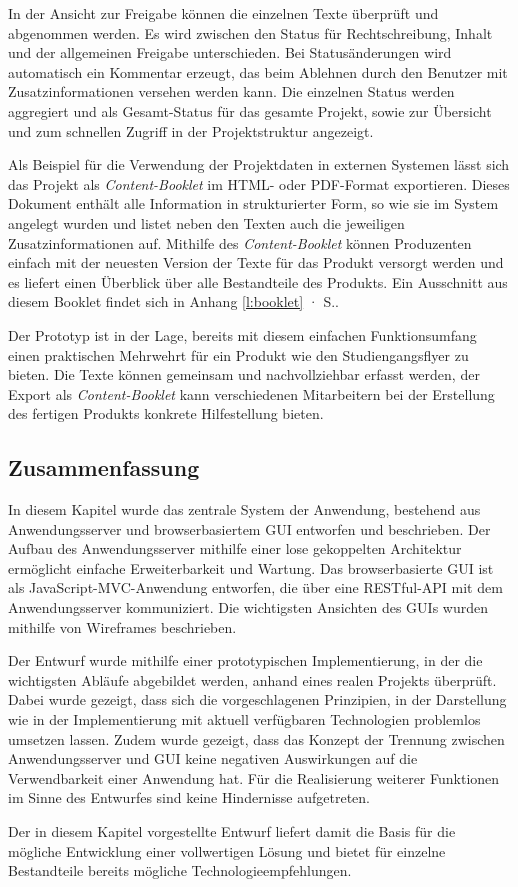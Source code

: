 In der Ansicht zur Freigabe können die einzelnen Texte überprüft und abgenommen werden. Es wird zwischen den Status für Rechtschreibung, Inhalt und der allgemeinen Freigabe unterschieden. Bei Statusänderungen wird automatisch ein Kommentar erzeugt, das beim Ablehnen durch den Benutzer mit Zusatzinformationen versehen werden kann. Die einzelnen Status werden aggregiert und als Gesamt-Status für das gesamte Projekt, sowie zur Übersicht und zum schnellen Zugriff in der Projektstruktur angezeigt.

Als Beispiel für die Verwendung der Projektdaten in externen Systemen lässt sich das Projekt als \emph{Content-Booklet} im HTML- oder PDF-Format exportieren. Dieses Dokument enthält alle Information in strukturierter Form, so wie sie im System angelegt wurden und listet neben den Texten auch die jeweiligen Zusatzinformationen auf. Mithilfe des \emph{Content-Booklet} können Produzenten einfach mit der neuesten Version der Texte für das Produkt versorgt werden und es liefert einen Überblick über alle Bestandteile des Produkts. Ein Ausschnitt aus diesem Booklet findet sich in Anhang \ref{l:booklet} · S.\pageref{l:booklet}.

\secbar

Der Prototyp ist in der Lage, bereits mit diesem einfachen Funktionsumfang einen praktischen Mehrwehrt für ein Produkt wie den Studiengangsflyer zu bieten. Die Texte können gemeinsam und nachvollziehbar erfasst werden, der Export als \emph{Content-Booklet} kann verschiedenen Mitarbeitern bei der Erstellung des fertigen Produkts konkrete Hilfestellung bieten.

\pagebreak

\subsection{Zusammenfassung}

In diesem Kapitel wurde das zentrale System der Anwendung, bestehend aus Anwendungsserver und browserbasiertem GUI entworfen und beschrieben. Der Aufbau des Anwendungsserver mithilfe einer lose gekoppelten Architektur ermöglicht einfache Erweiterbarkeit und Wartung. Das browserbasierte GUI ist als JavaScript-MVC-Anwendung entworfen, die über eine RESTful-API mit dem Anwendungsserver kommuniziert. Die wichtigsten Ansichten des GUIs wurden mithilfe von Wireframes beschrieben. 

Der Entwurf wurde mithilfe einer prototypischen Implementierung, in der die wichtigsten Abläufe abgebildet werden, anhand eines realen Projekts überprüft. Dabei wurde gezeigt, dass sich die vorgeschlagenen Prinzipien, in der Darstellung wie in der Implementierung mit aktuell verfügbaren Technologien problemlos umsetzen lassen. Zudem wurde gezeigt, dass das Konzept der Trennung zwischen Anwendungsserver und GUI keine negativen Auswirkungen auf die Verwendbarkeit einer Anwendung hat. Für die Realisierung weiterer Funktionen im Sinne des Entwurfes sind keine Hindernisse aufgetreten.

\secbar

Der in diesem Kapitel vorgestellte Entwurf liefert damit die Basis für die mögliche Entwicklung einer vollwertigen Lösung und bietet für einzelne Bestandteile bereits mögliche Technologieempfehlungen.

\pagebreak
